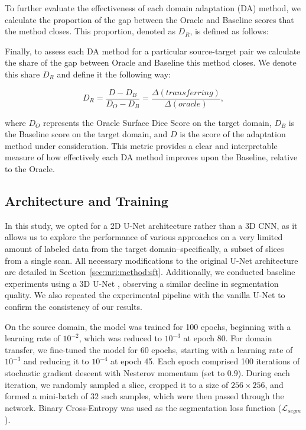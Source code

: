 To further evaluate the effectiveness of each domain adaptation (DA) method, we calculate the proportion of the gap between the Oracle and Baseline scores that the method closes. This proportion, denoted as $D_R$, is defined as follows:

Finally, to assess each DA method for a particular source-target pair we calculate the share of the gap between Oracle and Baseline this method closes. We denote this share $D_R$ and define it the following way:

\begin{equation}
	D_R = \dfrac{D - D_B}{D_O - D_B} = \dfrac{\Delta(transferring)}{\Delta(oracle)},
\end{equation}

\noindent
where $D_O$ represents the Oracle Surface Dice Score on the target domain, $D_B$ is the Baseline score on the target domain, and $D$ is the score of the adaptation method under consideration. This metric provides a clear and interpretable measure of how effectively each DA method improves upon the Baseline, relative to the Oracle.


\subsection{Architecture and Training}

In this study, we opted for a 2D U-Net architecture \cite{unet} rather than a 3D CNN, as it allows us to explore the performance of various approaches on a very limited amount of labeled data from the target domain--specifically, a subset of slices from a single scan. All necessary modifications to the original U-Net architecture are detailed in Section~\ref{sec:mri:method:sft}. Additionally, we conducted baseline experiments using a 3D U-Net \cite{cciccek20163d}, observing a similar decline in segmentation quality. We also repeated the experimental pipeline with the vanilla U-Net to confirm the consistency of our results.

On the source domain, the model was trained for 100 epochs, beginning with a learning rate of $10^{-2}$, which was reduced to $10^{-3}$ at epoch 80. For domain transfer, we fine-tuned the model for 60 epochs, starting with a learning rate of $10^{-3}$ and reducing it to $10^{-4}$ at epoch 45. Each epoch comprised 100 iterations of stochastic gradient descent with Nesterov momentum (set to $0.9$). During each iteration, we randomly sampled a slice, cropped it to a size of $256 \times 256$, and formed a mini-batch of $32$ such samples, which were then passed through the network. Binary Cross-Entropy was used as the segmentation loss function ($\mathcal{L}_{segm}$).

